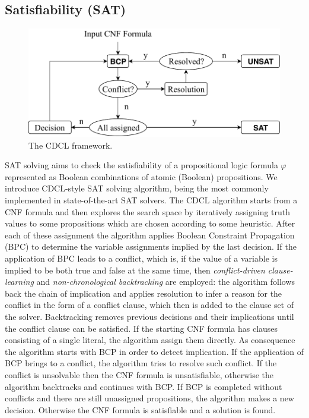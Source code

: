 \subsection{Satisfiability (SAT)}
\begin{figure}[ht]
    \centering
    \includegraphics{Images/SAT.pdf}
    \caption{The CDCL framework.}
    \label{fig:cdcl-frame}
\end{figure}
SAT solving aims to check the satisfiability of a propositional logic formula $\varphi$ represented as Boolean combinations of atomic (Boolean) propositions. We introduce CDCL-style SAT solving algorithm, being the most commonly implemented in state-of-the-art SAT solvers.
The CDCL algorithm starts from a CNF formula and then explores the search space by iteratively assigning truth values to some propositions which are chosen according to some heuristic. After each of these assignment the algorithm applies Boolean Constraint Propagation (BPC) to determine the variable assignments implied by the last decision. If the application of BPC leads to a conflict, which is, if the value of a variable is implied to be both true and false at the same time, then \textit{conflict-driven clause-learning} and \textit{non-chronological backtracking} are employed: the algorithm follows back the chain of implication and applies resolution to infer a reason for the conflict in the form of a conflict clause, which then is added to the clause set of the solver. Backtracking removes previous decisions and their implications until the conflict clause can be satisfied. If the starting CNF formula has clauses consisting of a single literal, the algorithm assign them directly. As consequence the algorithm starts with BCP in order to detect implication. If the application of BCP brings to a conflict, the algorithm tries to resolve such conflict. If the conflict is unsolvable then the CNF formula is unsatisfiable, otherwise the algorithm backtracks and continues with BCP. If BCP is completed without conflicts and there are still unassigned propositions, the algorithm makes a new decision. Otherwise the CNF formula is satisfiable and a solution is found.
%
